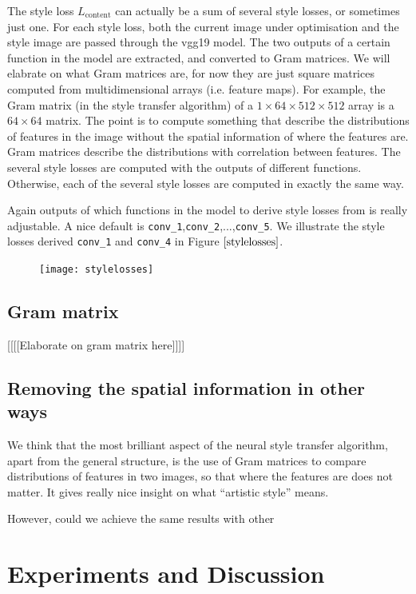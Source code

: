 \documentclass[runningheads]{llncs}
\begin{document}
The style loss $L_\text{content}$ can actually be a sum of several style losses, or sometimes just one.
For each style loss, 
both the current image under optimisation and the style image are passed through the vgg19 model.
The two outputs of a certain function in the model are extracted, 
and converted to Gram matrices. We will elabrate on what Gram matrices are,
for now they are just square matrices computed from multidimensional arrays (i.e. feature maps).
For example, the Gram matrix (in the style transfer algorithm) of a $1\times64\times512\times512$ array
is a $64\times64$ matrix.
The point is to compute something that describe the distributions of features
in the image without the spatial information of where the features are.
Gram matrices describe the distributions with correlation between features.
The several style losses are computed with the outputs of different functions.
Otherwise, each of the several style losses are computed in exactly the same way.

Again outputs of which functions in the model to derive style losses from is really adjustable.
A nice default is \verb|conv_1|,\verb|conv_2|,...,\verb|conv_5|. We illustrate
the style losses derived \verb|conv_1| and \verb|conv_4| in Figure $\ref{stylelosses}$.

\begin{figure}
\center
\texttt{[image: stylelosses]}
\end{figure}

\subsection{Gram matrix}
[[[[Elaborate on gram matrix here]]]]

\subsection{Removing the spatial information in other ways}
We think that the most brilliant aspect of the neural style transfer algorithm,
apart from the general structure, is the use of Gram matrices to compare 
distributions of features in two images, so that where the features are does not matter.
It gives really nice insight on what ``artistic style'' means.

However, could we achieve the same results with other 

\section{Experiments and Discussion}
\end{document}
